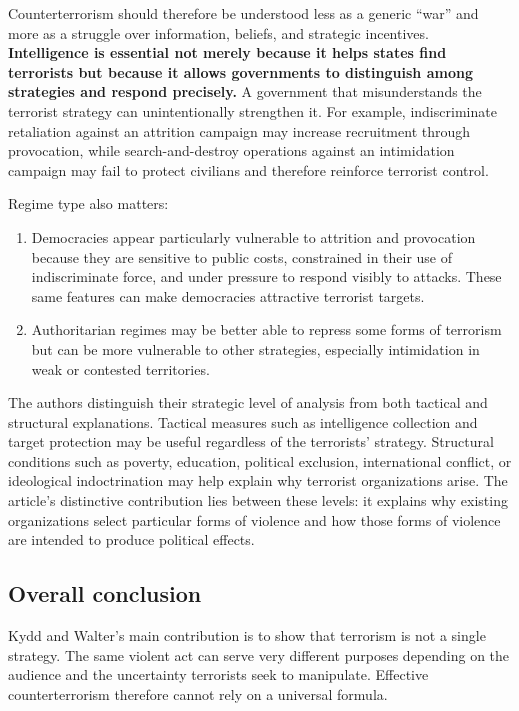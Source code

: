 Counterterrorism should therefore be understood less as a generic ``war'' and more as a struggle over information, beliefs, and strategic incentives. \textbf{Intelligence is essential not merely because it helps states find terrorists but because it allows governments to distinguish among strategies and respond precisely.} A government that misunderstands the terrorist strategy can unintentionally strengthen it. For example, indiscriminate retaliation against an attrition campaign may increase recruitment through provocation, while search-and-destroy operations against an intimidation campaign may fail to protect civilians and therefore reinforce terrorist control.

Regime type also matters:

\begin{enumerate}
    \item Democracies appear particularly vulnerable to attrition and provocation because they are sensitive to public costs, constrained in their use of indiscriminate force, and under pressure to respond visibly to attacks. These same features can make democracies attractive terrorist targets.
    
    \item Authoritarian regimes may be better able to repress some forms of terrorism but can be more vulnerable to other strategies, especially intimidation in weak or contested territories.
\end{enumerate}

The authors distinguish their strategic level of analysis from both tactical and structural explanations. Tactical measures such as intelligence collection and target protection may be useful regardless of the terrorists' strategy. Structural conditions such as poverty, education, political exclusion, international conflict, or ideological indoctrination may help explain why terrorist organizations arise. The article's distinctive contribution lies between these levels: it explains why existing organizations select particular forms of violence and how those forms of violence are intended to produce political effects.

\subsection{Overall conclusion}

Kydd and Walter's main contribution is to show that terrorism is not a single strategy. The same violent act can serve very different purposes depending on the audience and the uncertainty terrorists seek to manipulate. Effective counterterrorism therefore cannot rely on a universal formula.

